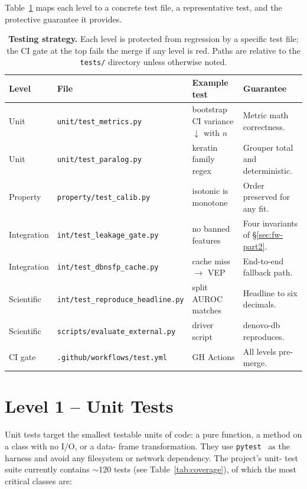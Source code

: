 \documentclass[11pt,a4paper,oneside]{report}
\begin{document}
Table~\ref{tab:test-strategy} maps each level to a
concrete test file, a representative test, and the
protective guarantee it provides.

\begin{table}[htbp]
\centering
\scriptsize
\setlength{\tabcolsep}{4pt}
\begin{tabularx}{\linewidth}{@{}>{\raggedright\arraybackslash}p{1.6cm}>{\raggedright\arraybackslash}p{3.4cm}>{\raggedright\arraybackslash}p{3.5cm}X@{}}
\toprule
\textbf{Level} & \textbf{File} & \textbf{Example test} & \textbf{Guarantee} \\
\midrule
Unit & \texttt{unit/test\_metrics.py} & bootstrap CI variance $\downarrow$ with $n$ & Metric math correctness. \\
Unit & \texttt{unit/test\_paralog.py} & keratin family regex & Grouper total and deterministic. \\
Property & \texttt{property/test\_calib.py} & isotonic is monotone & Order preserved for any fit. \\
Integration & \texttt{int/test\_leakage\_gate.py} & no banned features & Four invariants of \S\ref{sec:fw-part2}. \\
Integration & \texttt{int/test\_dbnsfp\_cache.py} & cache miss $\to$ VEP & End-to-end fallback path. \\
Scientific & \texttt{int/test\_reproduce\_headline.py} & split AUROC matches & Headline to six decimals. \\
Scientific & \texttt{scripts/evaluate\_external.py} & driver script & denovo-db reproduces. \\
CI gate & \texttt{.github/workflows/test.yml} & GH Actions & All levels pre-merge. \\
\bottomrule
\end{tabularx}
\caption[Testing strategy]{\textbf{Testing strategy.} Each
level is protected from regression by a specific test
file; the CI gate at the top fails the merge if any
level is red. Paths are relative to the \texttt{tests/}
directory unless otherwise noted.}
\label{tab:test-strategy}
\end{table}

\section{Level 1 -- Unit Tests}
\label{sec:test-unit}

Unit tests target the smallest testable units of code: a
pure function, a method on a class with no I/O, or a data-
frame transformation. They use
\texttt{pytest}~\citep{pytest2024} as the harness and avoid
any filesystem or network dependency. The project's unit-
test suite currently contains $\sim$120 tests (see
Table~\ref{tab:coverage}), of which the most critical
classes are:
\end{document}
